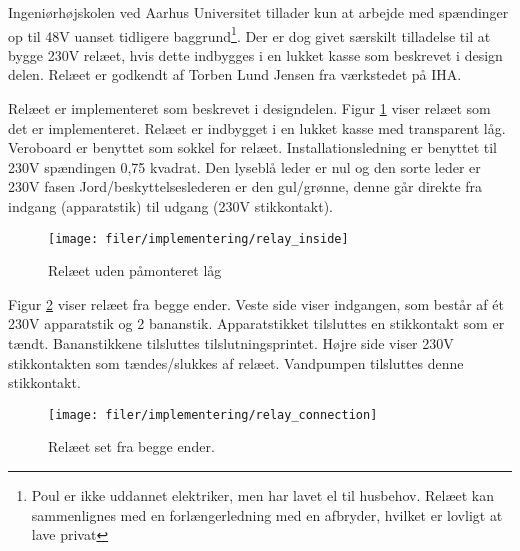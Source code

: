 Ingeniørhøjskolen ved Aarhus Universitet tillader kun at arbejde med spændinger op til 48V uanset tidligere baggrund\footnote{Poul er ikke uddannet elektriker, men har lavet el til husbehov. Relæet kan sammenlignes med en forlængerledning med en afbryder, hvilket er lovligt at lave privat}. Der er dog givet særskilt tilladelse til at bygge 230V relæet, hvis dette indbygges i en lukket kasse som beskrevet i design delen. Relæet er godkendt af Torben Lund Jensen fra værkstedet på IHA.

Relæet er implementeret som beskrevet i designdelen. Figur \ref{lab:Relay_inside} viser relæet som det er implementeret. Relæet er indbygget i en lukket kasse med transparent låg. 
Veroboard er benyttet som sokkel for relæet. Installationsledning er benyttet til 230V spændingen 0,75 kvadrat.
Den lyseblå leder er nul og den sorte leder er 230V fasen 
Jord/beskyttelseslederen er den gul/grønne, denne går direkte fra indgang (apparatstik) til udgang (230V stikkontakt). 
  


\begin{figure}[htb]
\centering
{\texttt{[image: filer/implementering/relay\_inside]}}
\caption{Relæet uden påmonteret låg}
\label{lab:Relay_inside}
\end{figure}

Figur \ref{lab:Relay_connection} viser relæet fra begge ender. Veste side viser indgangen, som består af ét 230V apparatstik og 2 bananstik. Apparatstikket tilsluttes en stikkontakt som er tændt. Bananstikkene tilsluttes tilslutningsprintet. Højre side viser 230V stikkontakten som tændes/slukkes af relæet. Vandpumpen tilsluttes denne stikkontakt.

\begin{figure}[htb]
\centering
{\texttt{[image: filer/implementering/relay\_connection]}}
\caption{Relæet set fra begge ender.}
\label{lab:Relay_connection}
\end{figure}
